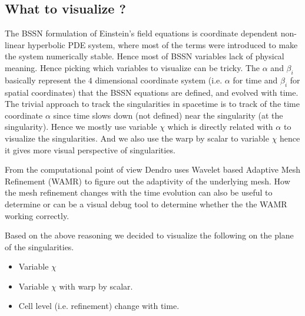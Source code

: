 \subsection{What to visualize ?}
The BSSN formulation of Einstein's field equations is coordinate dependent non-linear hyperbolic PDE system, where most of the terms were introduced to make the system numerically stable. Hence most of BSSN variables lack of physical meaning. Hence picking which variables to visualize can be tricky. The $\alpha$ and $\beta_i$ basically represent the $4$ dimensional coordinate system (i.e. $\alpha$ for time and $\beta_i$ for spatial coordinates) that the BSSN equations are defined, and evolved with time. The trivial approach to track the singularities in spacetime is to track of the time coordinate $\alpha$ since time slows down (not defined) near the singularity (at the singularity). Hence we mostly use variable $\chi$ which is directly related with $\alpha$ to visualize the singularities. And we also use the warp by scalar to variable $\chi$ hence it gives more visual perspective of singularities. 

\par From the computational point of view Dendro uses Wavelet based Adaptive Mesh Refinement (WAMR) to figure out the adaptivity of the underlying mesh. How the mesh refinement changes with the time evolution can also be useful to determine or can be a visual debug tool to determine whether the the WAMR working correctly. 

Based on the above reasoning we decided to visualize the following on the plane of the singularities. 

\begin{itemize}
\item Variable $\chi$  
\item Variable $\chi$ with warp by scalar. 
\item Cell level (i.e. refinement) change with time.
\end{itemize}
